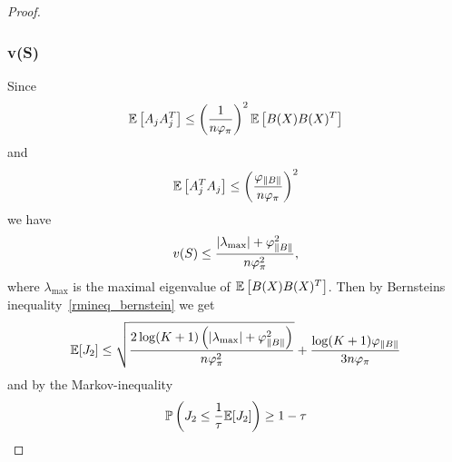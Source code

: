 \begin{proof}
\subsubsection*{v(S)}
Since
\begin{gather}
  \mathbb{E}
  \left[ 
    A_j A_j^T
  \right]
  \le
  \left( 
    \frac{1}{n \varphi_{\pi}}
  \right)^2
  \mathbb{E}
  \left[ 
    B(X) B(X)^T
  \right]
\end{gather}
and
\begin{gather}
  \mathbb{E}
  \left[ 
    A_j^T A_j
  \right]
  \le
  \left( 
    \frac{\varphi_{\left\lVert B\right\rVert}}{n \varphi_{\pi}}
  \right)^2
\end{gather}
we have
\begin{gather}
  v(S)
  \le
  \frac{|\lambda_{\max} | + \varphi_{\left\lVert B\right\rVert}^2}{n \varphi_{\pi}^2},
\end{gather}
where 
$\lambda_{\max}$ is the maximal eigenvalue of
$
  \mathbb{E}
  \left[ 
    B(X) B(X)^T
  \right]
$.
Then by Bernsteins inequality~\ref{rmineq_bernstein}
we get
\begin{gather}
  \mathbb{E}[J_2]
  \le
  \sqrt{
    \frac{
    2 \log (K + 1)
    \left( 
      |\lambda_{\max} | + \varphi_{\left\lVert B\right\rVert}^2
    \right)
    }
    {
      n \varphi_{\pi}^2
    }
  }
  +
  \frac{
    \log (K + 1)
    \varphi_{\left\lVert B\right\rVert}
  }
  {
    3 n \varphi_{\pi}
  }
\end{gather}
and by the Markov-inequality
\begin{gather}
  \mathbb{P}
  \left( 
    J_2 
    \le
    \frac{1}{\tau}
    \mathbb{E}[J_2]
  \right)
  \ge 
  1 - \tau
\end{gather}
\end{proof}
